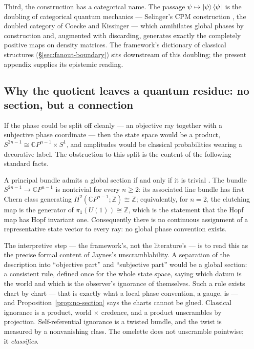 Third, the construction has a categorical name. The passage
$\psi \mapsto \ket{\psi}\bra{\psi}$ is the doubling of categorical
quantum mechanics --- Selinger's CPM construction
\autocite{selinger2007dagger}, the doubled category of Coecke and
Kissinger \autocite{CoeckeKissinger2017} --- which annihilates global
phases by construction and, augmented with discarding, generates
exactly the completely positive maps on density matrices. The
framework's dictionary of classical structures
(\S\ref{sec:fanout-boundary}) sits downstream of this doubling; the present
appendix supplies its epistemic reading.

\subsection{Why the quotient leaves a quantum residue: no section, but
  a connection}
\label{app:jaynes:section}

If the phase could be split off cleanly --- an objective ray together
with a subjective phase coordinate --- then the state space would be a
product, $S^{2n-1} \cong \mathbb{C}P^{n-1} \times S^{1}$, and
amplitudes would be classical probabilities wearing a decorative
label. The obstruction to this split is the content of the following
standard facts.

\begin{proposition}
\label{prop:no-section}
A principal bundle admits a global section if and only if it is
trivial \autocite{steenrod1951topology}. The bundle
$S^{2n-1} \to \mathbb{C}P^{n-1}$ is nontrivial for every $n \geq 2$:
its associated line bundle has first Chern class generating
$H^{2}(\mathbb{C}P^{n-1};\mathbb{Z}) \cong \mathbb{Z}$; equivalently,
for $n = 2$, the clutching map is the generator of
$\pi_{1}(U(1)) \cong \mathbb{Z}$, which is the statement that the Hopf
map has Hopf invariant one. Consequently there is no continuous
assignment of a representative state vector to every ray: no global
phase convention exists.
\end{proposition}

The interpretive step --- the framework's, not the literature's --- is
to read this as the precise formal content of Jaynes's
unscramblability. A separation of the description into ``objective
part'' and ``subjective part'' would be a global section: a consistent
rule, defined once for the whole state space, saying which datum is
the world and which is the observer's ignorance of themselves. Such a
rule exists chart by chart --- that is exactly what a local phase
convention, a gauge, is --- and Proposition~\ref{prop:no-section} says
the charts cannot be glued. Classical ignorance is a product, world
$\times$ credence, and a product unscrambles by projection.
Self-referential ignorance is a twisted bundle, and the twist is
measured by a nonvanishing class. The omelette does not unscramble
pointwise; it \emph{classifies}.

